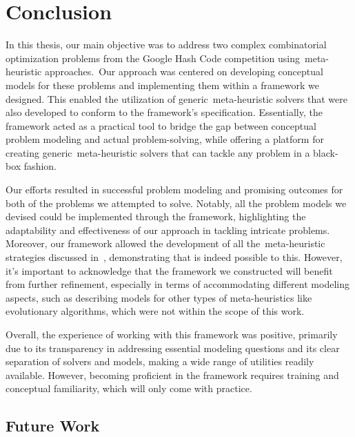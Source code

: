 \chapter{Conclusion}
\label{ch:conclusion}


In this thesis, our main objective was to address two complex combinatorial
optimization problems from the Google Hash Code competition using~\acrshort{meta-heuristic}
approaches.~Our approach was centered on developing conceptual models for these
problems and implementing them within a framework we designed. This enabled the
utilization of generic~\acrshort{meta-heuristic} solvers that were also developed to
conform to the framework's specification. Essentially, the framework acted as a
practical tool to bridge the gap between conceptual problem modeling and actual
problem-solving, while offering a platform for creating generic~\acrshort{meta-heuristic}
solvers that can tackle any problem in a black-box fashion.

Our efforts resulted in successful problem modeling and promising outcomes for
both of the problems we attempted to solve. Notably, all the problem models we
devised could be implemented through the framework, highlighting the
adaptability and effectiveness of our approach in tackling intricate problems.
Moreover, our framework allowed the development of all the~\acrshort{meta-heuristic}
strategies discussed in~, demonstrating that is indeed
possible to this. However, it's important to acknowledge that the framework we
constructed will benefit from further refinement, especially in terms of
accommodating different modeling aspects, such as describing models for other
types of meta-heuristics like evolutionary algorithms, which were not within the
scope of this work.

Overall, the experience of working with this framework was positive, primarily
due to its transparency in addressing essential modeling questions and its clear
separation of solvers and models, making a wide range of utilities readily
available. However, becoming proficient in the framework requires
training and conceptual familiarity, which will only come with practice.

\section{Future Work}

